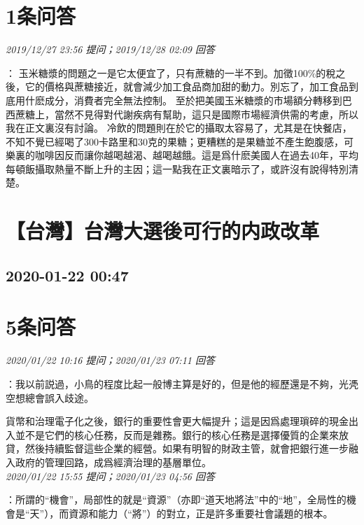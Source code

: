 \documentclass[twocolumn]{ctexart}
\begin{document}
\section{1条问答}

\textit{\hfill\noindent\small 2019/12/27 23:56 提问；2019/12/28 02:09 回答}

：
玉米糖漿的問題之一是它太便宜了，只有蔗糖的一半不到。加徵100\%的稅之後，它的價格與蔗糖接近，就會減少加工食品商加甜的動力。別忘了，加工食品到底用什麽成分，消費者完全無法控制。 
至於把美國玉米糖漿的市場額分轉移到巴西蔗糖上，當然不見得對代謝疾病有幫助，這只是國際市場經濟供需的考慮，所以我在正文裏沒有討論。 
冷飲的問題則在於它的攝取太容易了，尤其是在快餐店，不知不覺已經喝了300卡路里和30克的果糖；更糟糕的是果糖並不產生飽腹感，可樂裏的咖啡因反而讓你越喝越渴、越喝越餓。這是爲什麽美國人在過去40年，平均每頓飯攝取熱量不斷上升的主因；這一點我在正文裏暗示了，或許沒有說得特別清楚。
\\


\section{【台灣】台灣大選後可行的内政改革}
\subsection{2020-01-22 00:47}


\section{5条问答}

\textit{\hfill\noindent\small 2020/01/22 10:16 提问；2020/01/23 07:11 回答}

：我以前説過，小鳥的程度比起一般博主算是好的，但是他的經歷還是不夠，光凴空想總會誤入歧途。

貨幣和治理電子化之後，銀行的重要性會更大幅提升；這是因爲處理瑣碎的現金出入並不是它們的核心任務，反而是雜務。銀行的核心任務是選擇優質的企業來放貸，然後持續監督這些企業的經營。如果有明智的財政主管，就會把銀行進一步融入政府的管理回路，成爲經濟治理的基層單位。
\\

\textit{\hfill\noindent\small 2020/01/22 15:55 提问；2020/01/23 04:56 回答}

：所謂的“機會”，局部性的就是“資源”（亦即“道天地將法”中的“地”，全局性的機會是“天”），而資源和能力（“將”）的對立，正是許多重要社會議題的根本。
\end{document}
